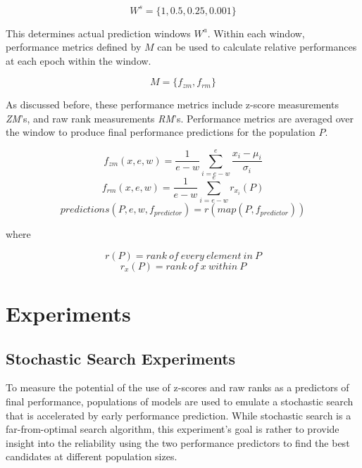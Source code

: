 \documentclass[twocolumn]{article}
\begin{document}
\[W^s = \{1, 0.5, 0.25, 0.001\}\]

This determines actual prediction windows $W^a$.
Within each window, performance metrics defined by $M$ can be used to calculate relative performances at each epoch within the window.

\[M = \{f_{zm}, f_{rm}\}\]

As discussed before, these performance metrics include z-score measurements \emph{ZM}'s, and raw rank measurements \emph{RM}'s.
Performance metrics are averaged over the window to produce final performance predictions for the population $P$.

\[f_{zm}(x, e, w) = \frac{1}{e-w}\sum_{i=e-w}^{e}\frac{x_i - \mu_i}{\sigma_i}\]
\[f_{rm}(x, e, w) = \frac{1}{e-w}\sum_{i=e-w}^{e}r_{x_{i}}(P)\]
\[predictions(P, e, w, f_{predictor}) = r(map(P, f_{predictor}))\]
\begin{center}
where
\end{center}
\[r(P) = rank\ of\ every\ element\ in\ P\]
\[r_{x}(P) = rank\ of\ x\ within\ P\]

\section{Experiments}

\subsection{Stochastic Search Experiments}
To measure the potential of the use of z-scores and raw ranks as a predictors of final performance, populations of models are used to
emulate a stochastic search that is accelerated by early performance prediction. 
While stochastic search is a far-from-optimal search algorithm, this experiment's goal is rather to provide insight into the reliability 
using the two performance predictors to find the best candidates at different population sizes. 
\end{document}
